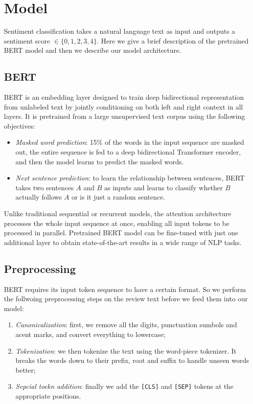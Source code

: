 \section{Model}

Sentiment classification takes a natural language text as input and outputs a
sentiment score $\in \{0, 1, 2, 3, 4\}$. Here we give a brief description of the
pretrained BERT model and then we describe our model architecture.

\subsection{BERT}

BERT is an embedding layer designed to train deep bidirectional representation
from unlabeled text by jointly conditioning on both left and right context in
all layers. It is pretrained from a large unsupervised text corpus using the
following objectives:

\begin{itemize}
	\item \textit{Masked word prediction}: 15\% of the words in the input
	      sequence are masked out, the entire sequence is fed to a deep bidirectional
	      Transformer encoder, and then the model learns to predict the masked words.

	\item \textit{Next sentence prediction}: to learn the relationship between
	      sentences, BERT takes two sentences $A$ and $B$ as inputs and learns to
	      classify whether $B$ actually follows $A$ or is it just a random sentence.
\end{itemize}

Unlike traditional sequential or recurrent models, the attention architecture
processes the whole input sequence at once, enabling all input tokens to be
processed in parallel. Pretrained BERT model can be fine-tuned with just one
additional layer to obtain state-of-the-art results in a wide range of NLP
tasks.

\subsection{Preprocessing}

BERT requires its input token sequence to have a certain format. So we perform
the follwoing preprocessing steps on the review text before we feed them into
our model:
\begin{enumerate}
	\item \textit{Canonicalization}: first, we remove all the digits,
	      punctuation sumbols and acent marks, and convert everything to lowercase;

	\item \textit{Tokenization}: we then tokenize the text using the word-piece
	      tokenizer. It breaks the words down to their prefix, root and suffix to
	      handle unseen words better;

	\item \textit{Sepcial toekn addition}: finally we add the \texttt{[CLS]} and
	      \texttt{[SEP]} tokens at the appropriate positions.
\end{enumerate}

